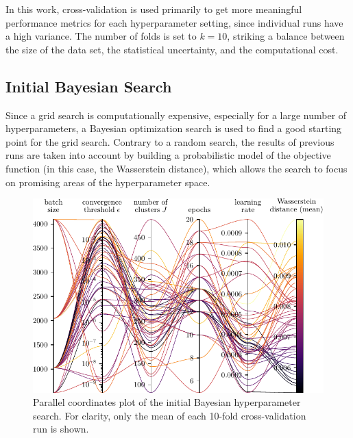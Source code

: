 In this work,
cross-validation is used primarily to get more meaningful performance metrics
for each hyperparameter setting,
  since individual runs have a high variance.
The number of folds is set to $k = 10$,
  striking a balance between
    the size of the data set,
    the statistical uncertainty,
    and the computational cost.


\subsection{Initial Bayesian Search} \label{sec:hyperparameters:initial_bayesian}
Since a grid search is computationally expensive,
  especially for a large number of hyperparameters,
a Bayesian optimization search \cite{wandb_bayesian} is used to find a good starting point for the grid search.
Contrary to a random search,
the results of previous runs are taken into account
  by building a probabilistic model of the objective function
    (in this case, the Wasserstein distance),
  which allows the search to focus on promising areas of the hyperparameter space.

\begin{figure}
  \centering
  \includegraphics[scale=1]{content/plots/hyperparam/combined_pcplot_full.pdf}
  \caption{
    Parallel coordinates plot of the initial Bayesian hyperparameter search.
    For clarity, only the mean of each 10-fold cross-validation run is shown.
  }
  \label{fig:hyperparameter:bayesian}
\end{figure}

